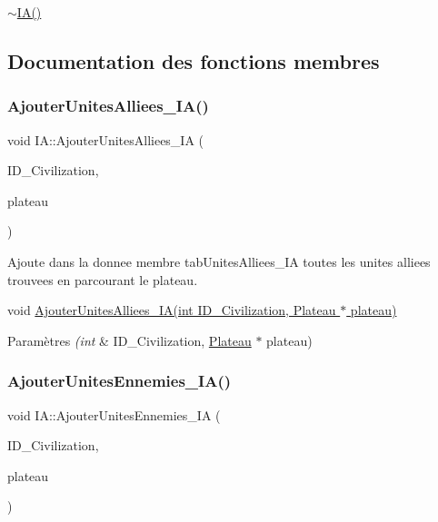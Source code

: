 \hyperlink{classIA_a67d4dd285ae5169239348432bab9ad0e}{$\sim$\+I\+A()} 

\subsection{Documentation des fonctions membres}
\mbox{\label{classIA_a7a37a63cb0ba3083e57e6f4e9fb30280}} 
\subsubsection{\texorpdfstring{Ajouter\+Unites\+Alliees\+\_\+\+I\+A()}{AjouterUnitesAlliees\_IA()}}
{\footnotesize\ttfamily void I\+A\+::\+Ajouter\+Unites\+Alliees\+\_\+\+IA (\begin{DoxyParamCaption}\item[{int}]{I\+D\+\_\+\+Civilization,  }\item[{\hyperlink{classPlateau}{Plateau} $\ast$}]{plateau }\end{DoxyParamCaption})}



Ajoute dans la donnee membre tab\+Unites\+Alliees\+\_\+\+IA toutes les unites alliees trouvees en parcourant le plateau. 

void \hyperlink{classIA_a7a37a63cb0ba3083e57e6f4e9fb30280}{Ajouter\+Unites\+Alliees\+\_\+\+I\+A(int I\+D\+\_\+\+Civilization, Plateau $\ast$ plateau)} 
\begin{DoxyParams}{Paramètres}
{\em (int} & I\+D\+\_\+\+Civilization, \hyperlink{classPlateau}{Plateau} $\ast$ plateau) \\
\hline
\end{DoxyParams}
\mbox{\label{classIA_a7a6d457ddad0c9a14cc18dbe72c5eed8}} 
\subsubsection{\texorpdfstring{Ajouter\+Unites\+Ennemies\+\_\+\+I\+A()}{AjouterUnitesEnnemies\_IA()}}
{\footnotesize\ttfamily void I\+A\+::\+Ajouter\+Unites\+Ennemies\+\_\+\+IA (\begin{DoxyParamCaption}\item[{int}]{I\+D\+\_\+\+Civilization,  }\item[{\hyperlink{classPlateau}{Plateau} $\ast$}]{plateau }\end{DoxyParamCaption})}



